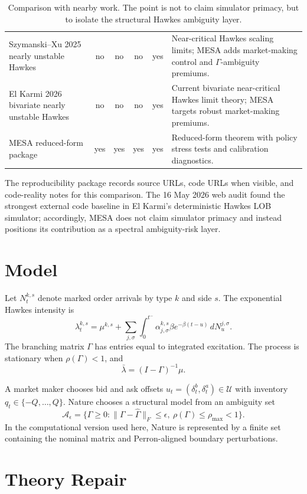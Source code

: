 \documentclass[11pt]{article}
\newcommand{\cA}{\mathcal{A}}
\newcommand{\cU}{\mathcal{U}}
\newcommand{\Gammahat}{\widehat{\Gamma}}
\begin{document}
\begin{table}[htbp]
{\begin{tabular}{@{}>{\raggedright\arraybackslash}p{4.2cm}cccc>{\raggedright\arraybackslash}p{4.6cm}@{}}
Szymanski--Xu 2025 nearly unstable Hawkes & no & no & no & yes & Near-critical Hawkes scaling limits; MESA adds market-making control and $\Gamma$-ambiguity premiums. \\
El Karmi 2026 bivariate nearly unstable Hawkes & no & no & no & yes & Current bivariate near-critical Hawkes limit theory; MESA targets robust market-making premiums. \\
MESA reduced-form package & yes & yes & yes & yes & Reduced-form theorem with policy stress tests and calibration diagnostics. \\
\bottomrule
\end{tabular}}
\caption{Comparison with nearby work. The point is not to claim simulator
primacy, but to isolate the structural Hawkes ambiguity layer.}
\label{tab:sota}
\end{table}

The reproducibility package records source URLs, code URLs when visible, and
code-reality notes for this comparison. The 16 May 2026 web audit found the
strongest external code baseline in El Karmi's deterministic Hawkes LOB
simulator; accordingly, MESA does not claim simulator primacy and instead
positions its contribution as a spectral ambiguity-risk layer.

\section{Model}

Let $N^{k,s}_t$ denote marked order arrivals by type $k$ and side $s$. The
exponential Hawkes intensity is
\[
\lambda^{k,s}_t = \mu^{k,s} +
\sum_{j,\sigma}\int_0^{t^-}
\alpha^{k,s}_{j,\sigma}\beta e^{-\beta(t-u)}\,dN^{j,\sigma}_u.
\]
The branching matrix $\Gamma$ has entries equal to integrated excitation. The
process is stationary when $\rho(\Gamma)<1$, and
\[
\bar\lambda = (I-\Gamma)^{-1}\mu.
\]

A market maker chooses bid and ask offsets
$u_t=(\delta^b_t,\delta^a_t)\in\cU$ with inventory $q_t\in\{-Q,\ldots,Q\}$.
Nature chooses a structural model from an ambiguity set
\[
\cA_\epsilon = \{\Gamma\ge 0:
\|\Gamma-\Gammahat\|_F\le \epsilon,\ \rho(\Gamma)\le \rho_{\max}<1\}.
\]
In the computational version used here, Nature is represented by a finite set
containing the nominal matrix and Perron-aligned boundary perturbations.

\section{Theory Repair}
\end{document}
